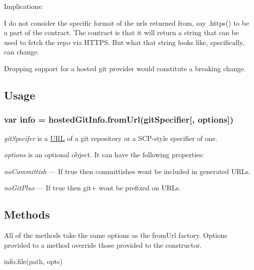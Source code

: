 Implications\+:


\begin{DoxyItemize}
\item I do not consider the specific format of the urls returned from, say {\ttfamily .https()} to be a part of the contract. The contract is that it will return a string that can be used to fetch the repo via H\+T\+T\+PS. But what that string looks like, specifically, can change.
\item Dropping support for a hosted git provider would constitute a breaking change.
\end{DoxyItemize}

\subsection*{Usage}

\subsubsection*{var info = hosted\+Git\+Info.\+from\+Url(git\+Specifier\mbox{[}, options\mbox{]})}


\begin{DoxyItemize}
\item {\itshape git\+Specifer} is a \mbox{\hyperlink{namespace_u_r_l}{U\+RL}} of a git repository or a S\+C\+P-\/style specifier of one.
\item {\itshape options} is an optional object. It can have the following properties\+:
\begin{DoxyItemize}
\item {\itshape no\+Committish} — If true then committishes won\textquotesingle{}t be included in generated U\+R\+Ls.
\item {\itshape no\+Git\+Plus} — If true then {\ttfamily git+} won\textquotesingle{}t be prefixed on U\+R\+Ls.
\end{DoxyItemize}
\end{DoxyItemize}

\subsection*{Methods}

All of the methods take the same options as the {\ttfamily from\+Url} factory. Options provided to a method override those provided to the constructor.


\begin{DoxyItemize}
\item info.\+file(path, opts)
\end{DoxyItemize}

